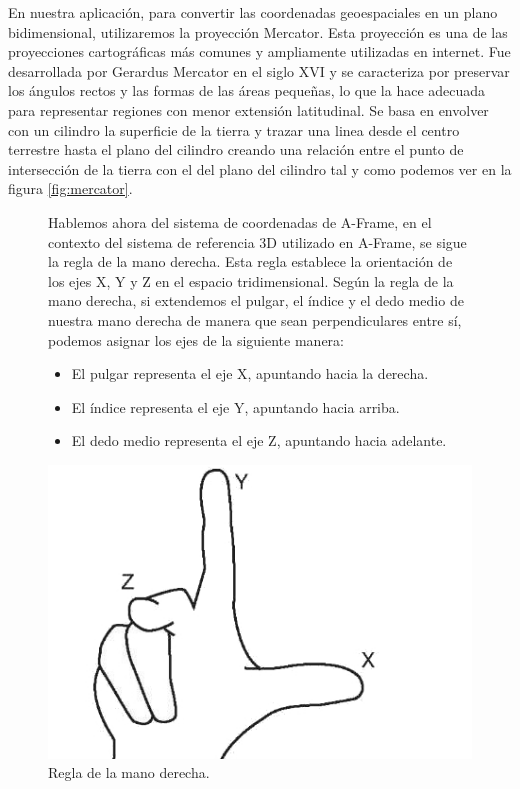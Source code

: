 \documentclass[a4paper, 11pt]{book}
\begin{document}
En nuestra aplicación, para convertir las coordenadas geoespaciales en un plano bidimensional, utilizaremos la proyección Mercator. Esta proyección es una de las proyecciones cartográficas más comunes y ampliamente utilizadas en internet. Fue desarrollada por Gerardus Mercator en el siglo XVI y se caracteriza por preservar los ángulos rectos y las formas de las áreas pequeñas, lo que la hace adecuada para representar regiones con menor extensión latitudinal. 
Se basa en envolver con un cilindro la superficie de la tierra y trazar una linea desde el centro terrestre hasta el plano del cilindro creando una relación entre el punto de intersección de la tierra con el del plano del cilindro tal y como podemos ver en la figura \ref{fig:mercator}.
\begin{figure}[H]
\begin{minipage}{0.7\textwidth}
Hablemos ahora del sistema de coordenadas de A-Frame, en el contexto del sistema de referencia 3D utilizado en A-Frame, se sigue la regla de la mano derecha. Esta regla establece la orientación de los ejes X, Y y Z en el espacio tridimensional.
Según la regla de la mano derecha, si extendemos el pulgar, el índice y el dedo medio de nuestra mano derecha de manera que sean perpendiculares entre sí, podemos asignar los ejes de la siguiente manera:
\begin{itemize}
    \item El pulgar representa el eje X, apuntando hacia la derecha.
    \item El índice representa el eje Y, apuntando hacia arriba.
    \item El dedo medio representa el eje Z, apuntando hacia adelante.
    
\end{itemize}
\end{minipage}
\hfill
\begin{minipage}{0.25\textwidth}
\includegraphics[width=\textwidth]{img/rightHand.jpg}
\caption{Regla de la mano derecha.}
\label{fig:rightHand}
\end{minipage}
\end{figure}
\end{document}
